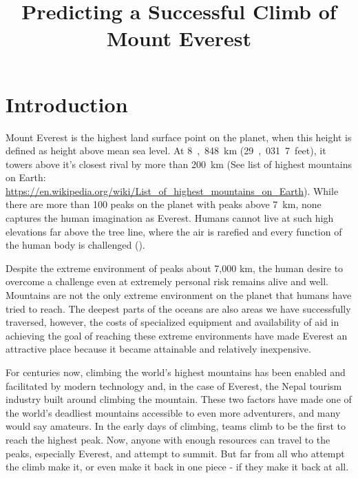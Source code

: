 \documentclass[stu,12pt,floatsintext]{apa7}
\title{Predicting a Successful Climb of Mount Everest}
\affiliation{University of San Diego}
\begin{document}
\maketitle %

\section{Introduction}
Mount Everest is the highest land surface point on the planet, when this height is defined as height above mean sea level. At \si{8,848~\km} (\si{29,031.7~feet}), it towers above it's closest rival by more than \si{200~\km} (See list of highest mountains on Earth: \url{https://en.wikipedia.org/wiki/List_of_highest_mountains_on_Earth}). While there are more than 100 peaks on the planet with peaks above \si{7~\km}, none captures the human imagination as Everest. Humans cannot live at such high elevations far above the tree line, where the air is rarefied and every function of the human body is challenged (\cite{gooshow2018}).

Despite the extreme environment of peaks about 7,000 km, the human desire to overcome a challenge even at extremely personal risk remains alive and well. Mountains are not the only extreme environment on the planet that humans have tried to reach. The deepest parts of the oceans are also areas we have successfully traversed, however, the costs of specialized equipment and availability of aid in achieving the goal of reaching these extreme environments have made Everest an attractive place because it became attainable and relatively inexpensive.

For centuries now, climbing the world's highest mountains has been enabled and facilitated by modern technology and, in the case of Everest, the Nepal tourism industry built around climbing the mountain. These two factors have made one of the world's deadliest mountains accessible to even more adventurers, and many would say amateurs. In the early days of climbing, teams climb to be the first to reach the highest peak. Now, anyone with enough resources can travel to the peaks, especially Everest, and attempt to summit. But far from all who attempt the climb make it, or even make it back in one piece - if they make it back at all.
\end{document}
